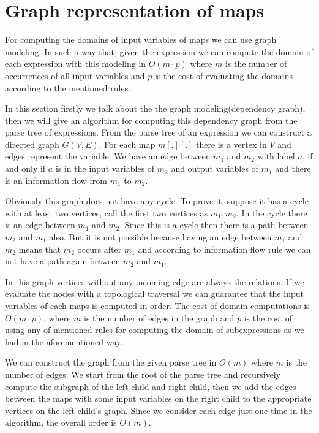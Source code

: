 \documentclass[12pt]{article}
\begin{document}
\section{Graph representation of maps}
For computing the domains of input variables of maps we can use graph modeling. In such a way that, given the expression we can compute the domain of each expression with this modeling in $O(m\cdot p)$ where $m$ is the number of occurrences of all input variables and $p$ is the cost of evaluating the domains according to the mentioned rules. \\
\par
In this section firstly we talk about the the graph modeling(dependency graph), then we will give an algorithm for computing this dependency graph from the parse tree of expressions. 
From the parse tree of an expression we can construct a directed graph $G(V,E)$. For each map $m[.][.]$ there is a vertex in $V$ and edges represent the variable. We have an edge between $m_{1}$ and $m_{2}$ with label $a$, if and only if $a$ is in the input variables of $m_{2}$ and output variables of $m_{1}$ and there is an information flow from $m_{1}$ to $m_{2}$. \\
\par
Obviously this graph does not have any cycle. To prove it, suppose it has a cycle with at least two vertices, call the first two vertices as $m_{1},m_{2}$. In the cycle there is an edge between $m_{1}$ and $m_{2}$. Since this is a cycle then there is a path between $m_{2}$ and $m_{1}$ also. But it is not possible because having an edge between $m_{1}$ and $m_{2}$ means that $m_{2}$ occurs after $m_{1}$ and according to information flow rule we can not have a path again between $m_{2}$ and $m_{1}$. \\
\par
In this graph vertices without any incoming edge are always the relations. If we evaluate the nodes with a topological traversal we can guarantee that the input variables of each maps is computed in order. The cost of domain computations is $O(m\cdot p)$, where $m$ is the number of edges in the graph and $p$ is the cost of using any of mentioned rules for computing the domain of subexpressions as we had in the aforementioned way. \\
\par
We can construct the graph from the given parse tree in $O(m)$ where $m$ is the number of edges. We start from the root of the parse tree and recursively compute the subgraph of the left child and right child, then we add the edges between the maps with some input variables on the right child to the appropriate vertices on the left child's graph. Since we consider each edge just one time in the algorithm, the overall order is $O(m)$. 
\end{document}

